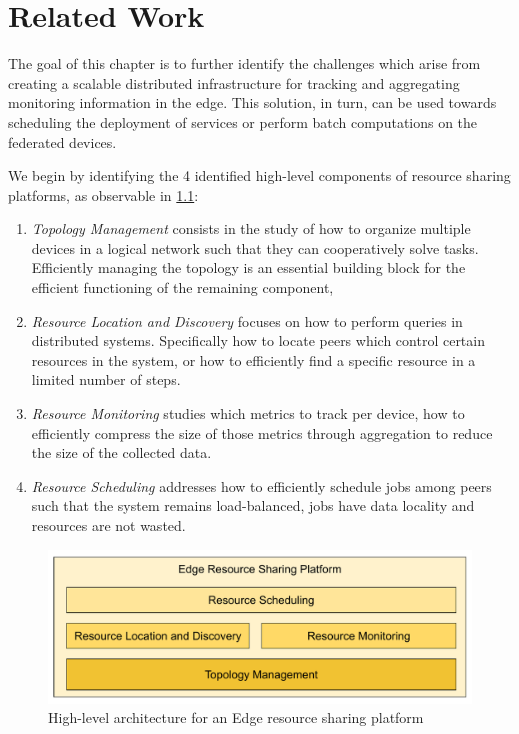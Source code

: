 \chapter{Related Work} \label{cha:related_work}

The goal of this chapter is to further identify the challenges which arise from creating a scalable distributed infrastructure for tracking and aggregating monitoring information in the edge. This solution, in turn, can be used towards scheduling the deployment of services or perform batch computations on the federated devices. 

We begin by identifying the 4 identified high-level components of resource sharing platforms, as observable in \ref{fig:proposed_architecture}:

\begin{enumerate}

    \item \textit{Topology Management} consists in the study of how to organize multiple devices in a logical network such that they can cooperatively solve tasks. Efficiently managing the topology is an essential building block for the efficient functioning of the remaining component,
    
    \item \textit{Resource Location and Discovery} focuses on how to perform queries in distributed systems. Specifically how to locate peers which control certain resources in the system, or how to efficiently find a specific resource in a limited number of steps.
    
    \item \textit{Resource Monitoring} studies which metrics to track per device, how to efficiently compress the size of those metrics through aggregation to reduce the size of the collected data.

    \item \textit{Resource Scheduling} addresses how to efficiently schedule jobs among peers such that the system remains load-balanced, jobs have data locality and resources are not wasted.

\end{enumerate}

\begin{figure}[h]
    \centering
    \includegraphics[width=\linewidth]{Figures/proposed_architecture.pdf}
    \caption{High-level architecture for an Edge resource sharing platform}
    \label{fig:proposed_architecture}
\end{figure}

